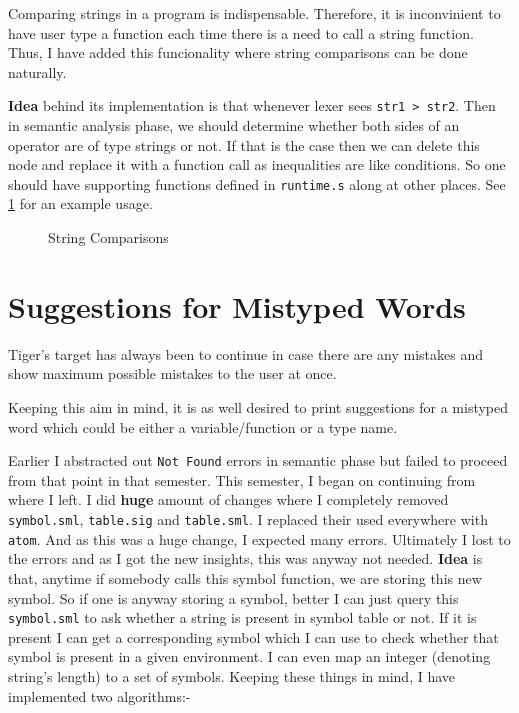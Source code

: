 Comparing strings in  a program is indispensable. Therefore, it is inconvinient to have user type a function each time there is a need to call a string function. Thus, I have added this funcionality where string comparisons can be done naturally.

\textbf{Idea} behind its implementation is that whenever lexer sees \texttt{str1 > str2}. Then in semantic analysis phase, we should determine whether both sides of an operator are of type strings or not. If that is the case then we can delete this node and replace it with a function call as inequalities are like conditions. So one should have supporting functions defined in \texttt{runtime.s} along at other places. See \ref{fig:sc} for an example usage.

\begin{figure}
	\centering
	\caption{String Comparisons}
	\label{fig:sc}
\end{figure}

\section{Suggestions for Mistyped Words}

Tiger's target has always been to continue in case there are any mistakes and show maximum possible mistakes to the user at once.

Keeping this aim in mind, it is as well desired to print suggestions for a mistyped word which could be either a variable/function or a type name.

Earlier I abstracted out \texttt{Not Found} errors in semantic phase but failed to proceed from that point in that semester. This semester, I began on continuing from where I left. I did \textbf{huge} amount of changes where I completely removed \texttt{symbol.sml}, \texttt{table.sig} and \texttt{table.sml}. I replaced their used everywhere with \texttt{atom}. And as this was a huge change, I expected many errors. Ultimately I lost to the errors and as I got the new insights, this was anyway not needed. \textbf{Idea} is that, anytime if somebody calls this symbol function, we are storing this new symbol. So if one is anyway storing a symbol, better I can just query this \texttt{symbol.sml} to ask whether a string is present in symbol table or not. If it is present I can get a corresponding symbol which I can use to check whether that symbol is present in a given environment. I can even map an integer (denoting string's length) to a set of symbols. Keeping these things in mind, I have implemented two algorithms:-

